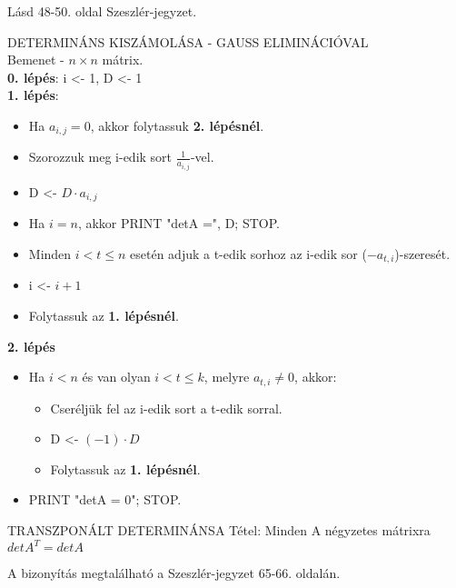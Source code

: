 \documentclass[]{article}
\begin{document}
\begin{leftbar}
Lásd 48-50. oldal Szeszlér-jegyzet.
\end{leftbar}
\begin{framed}
DETERMINÁNS KISZÁMOLÁSA -  GAUSS ELIMINÁCIÓVAL\\
Bemenet - $n\times n$ mátrix.\\
\textbf{0. lépés}: i <- 1, D <- 1\\
\textbf{1. lépés}:
\begin{itemize}
\item Ha $a_{i,j} = 0$, akkor folytassuk \textbf{2. lépésnél}.
\item Szorozzuk meg i-edik sort $\frac{1}{a_{i,j}}$-vel.
\item D <- $D \cdot a_{i,j}$
\item Ha $i = n$, akkor PRINT "detA =", D; STOP.
\item Minden $i < t \leq n$ esetén adjuk a t-edik sorhoz az i-edik sor ($-a_{t,i}$)-szeresét.
\item i <- $i+1$
\item Folytassuk az \textbf{1. lépésnél}.
\end{itemize}
\textbf{2. lépés}
\begin{itemize}
\item Ha $i < n$ és van olyan $i < t \leq k$, melyre $a_{t,i} \neq 0$, akkor:
\begin{itemize}
\item Cseréljük fel az i-edik sort a t-edik sorral.
\item D <- $(-1)\cdot D$
\item Folytassuk az \textbf{1. lépésnél}.
\end{itemize}
\item PRINT "detA = 0"; STOP.
\end{itemize}
\end{framed}
\begin{framed}
TRANSZPONÁLT DETERMINÁNSA Tétel: Minden A négyzetes mátrixra $detA^T = detA$
\end{framed}
\begin{leftbar}
A bizonyítás megtalálható a Szeszlér-jegyzet 65-66. oldalán.
\end{leftbar}
\end{document}
